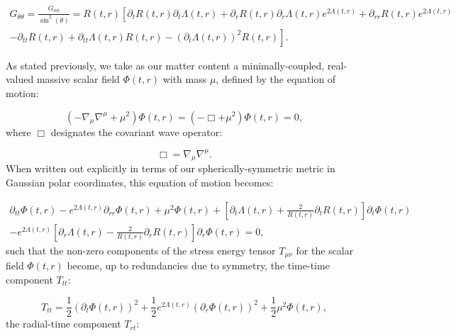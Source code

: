\documentclass{article}
\begin{document}
\begin{multline}
G_{\theta \theta} = \frac{G_{\phi \phi}}{\sin^{2} \left( \theta \right)} = R \left( t, r \right) \left[ \partial_t R \left( t, r \right) \partial_t \Lambda \left( t, r \right) + \partial_r R \left( t, r \right) \partial_r \Lambda \left( t, r \right) e^{2 \Lambda \left( t, r \right)} + \partial_{r r} R \left( t, r \right) e^{2 \Lambda \left( t, r \right)} \right.\\
\left. - \partial_{t t} R \left( t, r \right) + \partial_{t t} \Lambda \left( t, r \right) R \left( t, r \right) - \left( \partial_t \Lambda \left( t, r \right) \right)^2 R \left( t, r \right) \right].
\end{multline}

As stated previously, we take as our matter content a minimally-coupled, real-valued massive scalar field ${\Phi \left( t, r \right)}$ with mass ${\mu}$, defined by the equation of motion:

\begin{equation}
\left( - \nabla_{\mu} \nabla^{\mu} + \mu^2 \right) \Phi \left( t, r \right) = \left( - \Box + \mu^2 \right) \Phi \left( t, r \right) = 0,
\end{equation}
where ${\Box}$ designates the covariant wave operator:

\begin{equation}
\Box = \nabla_{\mu} \nabla^{\mu}.
\end{equation}
When written out explicitly in terms of our spherically-symmetric metric in Gaussian polar coordinates, this equation of motion becomes:

\begin{multline}
\partial_{t t} \Phi \left( t, r \right) - e^{2 \Lambda \left( t, r \right)} \partial_{r r} \Phi \left( t, r \right) + \mu^2 \Phi \left( t, r \right) + \left[ \partial_t \Lambda \left( t, r \right) + \frac{2}{R \left( t, r \right)} \partial_t R \left( t, r \right) \right] \partial_t \Phi \left( t, r \right)\\
- e^{2 \Lambda \left( t, r \right)} \left[ \partial_r \Lambda \left( t, r \right) - \frac{2}{R \left( t, r \right)} \partial_r R \left( t, r \right) \right] \partial_r \Phi \left( t, r \right) = 0,
\end{multline}
such that the non-zero components of the stress energy tensor ${T_{\mu \nu}}$ for the scalar field ${\Phi \left( t, r \right)}$ become, up to redundancies due to symmetry, the time-time component ${T_{t t}}$:

\begin{equation}
T_{t t} = \frac{1}{2} \left( \partial_t \Phi \left( t, r \right) \right)^2 + \frac{1}{2} e^{2 \Lambda \left( t, r \right)} \left( \partial_r \Phi \left( t, r \right) \right)^2 + \frac{1}{2} \mu^2 \Phi \left( t, r \right),
\end{equation}
the radial-time component ${T_{r t}}$:
\end{document}
